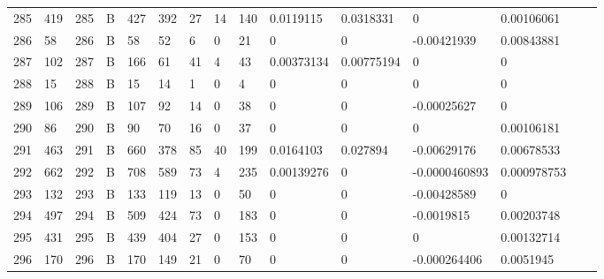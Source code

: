 \begin{longtable}{lllllllllllllll}
	285 & 419               & 285 & B   & 427               & 392               & 27                & 14   & 140        & 0.0119115      & 0.0318331      & 0             & 0.00106061   \\
	286 & 58                & 286 & B   & 58                & 52                & 6                 & 0    & 21         & 0              & 0              & -0.00421939   & 0.00843881   \\
	287 & 102               & 287 & B   & 166               & 61                & 41                & 4    & 43         & 0.00373134     & 0.00775194     & 0             & 0            \\
	288 & 15                & 288 & B   & 15                & 14                & 1                 & 0    & 4          & 0              & 0              & 0             & 0            \\
	289 & 106               & 289 & B   & 107               & 92                & 14                & 0    & 38         & 0              & 0              & -0.00025627   & 0            \\
	290 & 86                & 290 & B   & 90                & 70                & 16                & 0    & 37         & 0              & 0              & 0             & 0.00106181   \\
	291 & 463               & 291 & B   & 660               & 378               & 85                & 40   & 199        & 0.0164103      & 0.027894       & -0.00629176   & 0.00678533   \\
	292 & 662               & 292 & B   & 708               & 589               & 73                & 4    & 235        & 0.00139276     & 0              & -0.0000460893 & 0.000978753  \\
	293 & 132               & 293 & B   & 133               & 119               & 13                & 0    & 50         & 0              & 0              & -0.00428589   & 0            \\
	294 & 497               & 294 & B   & 509               & 424               & 73                & 0    & 183        & 0              & 0              & -0.0019815    & 0.00203748   \\
	295 & 431               & 295 & B   & 439               & 404               & 27                & 0    & 153        & 0              & 0              & 0             & 0.00132714   \\
	296 & 170               & 296 & B   & 170               & 149               & 21                & 0    & 70         & 0              & 0              & -0.000264406  & 0.0051945    \\

\end{longtable}

